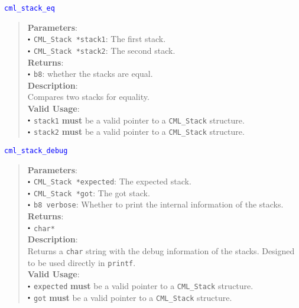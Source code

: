\documentclass[a4paper,oneside,10pt]{article}
\newcommand{\function}[1]{
  \noindent\textcolor{blue}{\texttt{#1}}
  \vspace{-0.3em}
}
\renewcommand{\dot}{\raisebox{0.3ex}{\scalebox{0.6}{$\bullet$}}}
\theoremstyle{definition}
\begin{document}
\function{cml\_stack\_eq}
\begin{quote}
  \textbf{Parameters}: \\
  $\dot$ \texttt{CML\_Stack *stack1}: The first stack. \\
  $\dot$ \texttt{CML\_Stack *stack2}: The second stack. \\
  \textbf{Returns}: \\
  $\dot$ \texttt{b8}: whether the stacks are equal. \\

  \vspace{-0.75em}
  \textbf{Description}: \\
  Compares two stacks for equality. \\

  \vspace{-0.75em}
  \textbf{Valid Usage}: \\
  $\dot$ \texttt{stack1} \textbf{must} be a valid pointer to a \texttt{CML\_Stack} structure. \\
  $\dot$ \texttt{stack2} \textbf{must} be a valid pointer to a \texttt{CML\_Stack} structure. \\
\end{quote}

\function{cml\_stack\_debug}
\begin{quote}
  \textbf{Parameters}: \\
  $\dot$ \texttt{CML\_Stack *expected}: The expected stack. \\
  $\dot$ \texttt{CML\_Stack *got}: The got stack. \\
  $\dot$ \texttt{b8 verbose}: Whether to print the internal information of the stacks. \\
  \textbf{Returns}: \\
  $\dot$ \texttt{char*} \\

  \vspace{-0.75em}
  \textbf{Description}: \\
  Returns a \texttt{char} string with the debug information of the stacks. Designed to be used directly in \texttt{printf}. \\
  
  \vspace{-0.75em}
  \textbf{Valid Usage}: \\
  $\dot$ \texttt{expected} \textbf{must} be a valid pointer to a \texttt{CML\_Stack} structure. \\
  $\dot$ \texttt{got} \textbf{must} be a valid pointer to a \texttt{CML\_Stack} structure. \\
\end{quote}
\end{document}

